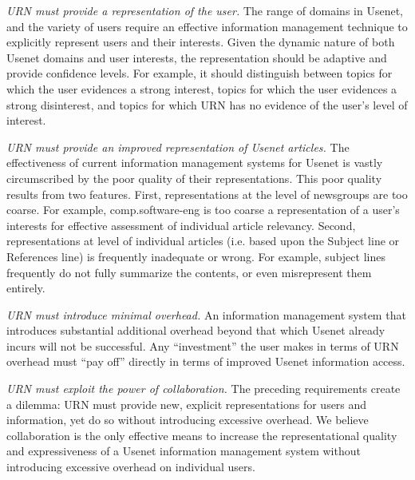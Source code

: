 \begin {itemizenoindent}

\item {\em URN must provide a representation of the user.} The range of
  domains in Usenet, and the variety of users require an effective information
  management technique to explicitly represent users and their interests.
  Given the dynamic nature of both Usenet domains and user interests, the
  representation should be adaptive and provide confidence levels. For example,
  it should distinguish between topics for which the user evidences a strong
  interest, topics for which the user evidences a strong disinterest, and
  topics for which URN has no evidence of the user's level of interest.
  
\item {\em URN must provide an improved representation of Usenet
  articles.} The effectiveness of current information management systems
  for Usenet is vastly circumscribed by the poor quality of their
  representations. This poor quality results from two features. First,
  representations at the level of newsgroups are too coarse. For example,
  comp.software-eng is too coarse a representation of a user's interests for
  effective assessment of individual article relevancy.  Second,
  representations at level of individual articles (i.e. based upon the
  Subject line or References line) is frequently inadequate or wrong.  For
  example, subject lines frequently do not fully summarize the contents, or
  even misrepresent them entirely.
  
\item {\em URN must introduce minimal overhead.} An information
  management system that introduces substantial additional overhead beyond
  that which Usenet already incurs will not be successful.  Any
  ``investment'' the user makes in terms of URN overhead must ``pay off''
  directly in terms of improved Usenet information access.
  
\item {\em URN must exploit the power of collaboration.} The preceding
  requirements create a dilemma: URN must provide new, explicit
  representations for users and information, yet do so without introducing
  excessive overhead.  We believe collaboration is the only effective means
  to increase the representational quality and expressiveness of a Usenet
  information management system without introducing excessive overhead on
  individual users.
\end {itemizenoindent}


